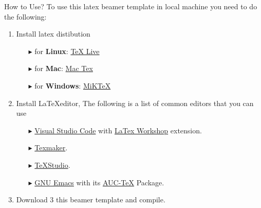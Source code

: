 \documentclass[10pt, aspectratio=169]{beamer}
\begin{document}
\begin{frame}{How to Use?}
    To use this latex beamer template in local machine you need to do the following:
    \begin{enumerate}
        \item Install latex distibution
              \begin{itemize}
                  \item[$\blacktriangleright$] for \textbf{Linux}: \href{https://www.google.com/search?q=how to install latex in linux?}{TeX Live}
                  \item[$\blacktriangleright$] for \textbf{Mac}: \href{https://www.google.com/search?q=how to install mac tex on mac?}{Mac Tex}
                  \item[$\blacktriangleright$] for \textbf{Windows}: \href{https://www.google.com/search?q=how to install miktex in windows?}{MiKTeX}
              \end{itemize}
        \item Install \LaTeX editor, The following is a list of common editors that you can use
              \begin{itemize}
                  \item[$\blacktriangleright$] \href{https://code.visualstudio.com/}{Visual Studio Code} with \href{https://marketplace.visualstudio.com/items?itemName=James-Yu.latex-workshop}{LaTex Workshop} extension.
                  \item[$\blacktriangleright$] \href{http://www.xm1math.net/texmaker/}{Texmaker}.
                  \item[$\blacktriangleright$] \href{http://texstudio.org/}{TeXStudio}.
                  \item[$\blacktriangleright$] \href{https://www.gnu.org/software/emacs/}{GNU Emacs} with its \href{https://gnu.org/software/auctex/}{AUC-TeX} Package.
               \end{itemize}
        \item Download 3 this beamer template and compile.
    \end{enumerate}
\end{frame}

\end{document}
